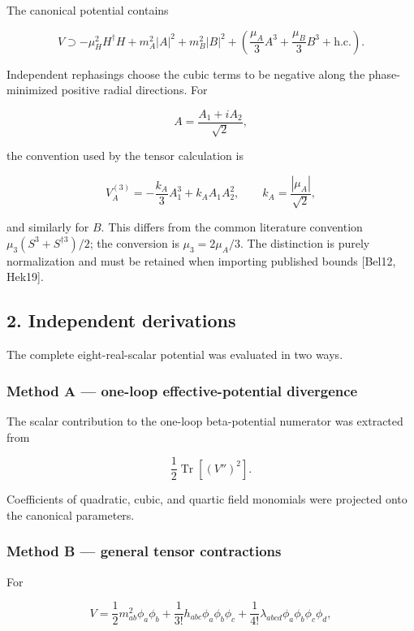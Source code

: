\documentclass[
]{article}
\begin{document}
The canonical potential contains

\[
V\supset -\mu_H^2 H^\dagger H+m_A^2|A|^2+m_B^2|B|^2
+\left(\frac{\mu_A}{3}A^3+\frac{\mu_B}{3}B^3+\mathrm{h.c.}\right).
\]

Independent rephasings choose the cubic terms to be negative along the
phase-minimized positive radial directions. For

\[
A=\frac{A_1+iA_2}{\sqrt2},
\]

the convention used by the tensor calculation is

\[
V_A^{(3)}=-\frac{k_A}{3}A_1^3+k_AA_1A_2^2,
\qquad k_A=\frac{|\mu_A|}{\sqrt2},
\]

and similarly for \(B\). This differs from the common literature
convention \(\mu_3(S^3+S^{\dagger3})/2\); the conversion is
\(\mu_3=2\mu_A/3\). The distinction is purely normalization and must be
retained when importing published bounds {[}Bel12, Hek19{]}.

\hypertarget{independent-derivations}{%
\subsection{2. Independent derivations}\label{independent-derivations}}

The complete eight-real-scalar potential was evaluated in two ways.

\hypertarget{method-a-one-loop-effective-potential-divergence}{%
\subsubsection{Method A --- one-loop effective-potential
divergence}\label{method-a-one-loop-effective-potential-divergence}}

The scalar contribution to the one-loop beta-potential numerator was
extracted from

\[
\frac12\operatorname{Tr}\!\left[(V'')^2\right].
\]

Coefficients of quadratic, cubic, and quartic field monomials were
projected onto the canonical parameters.

\hypertarget{method-b-general-tensor-contractions}{%
\subsubsection{Method B --- general tensor
contractions}\label{method-b-general-tensor-contractions}}

For

\[
V=\frac12m^2_{ab}\phi_a\phi_b+\frac1{3!}h_{abc}\phi_a\phi_b\phi_c
+\frac1{4!}\lambda_{abcd}\phi_a\phi_b\phi_c\phi_d,
\]
\end{document}
